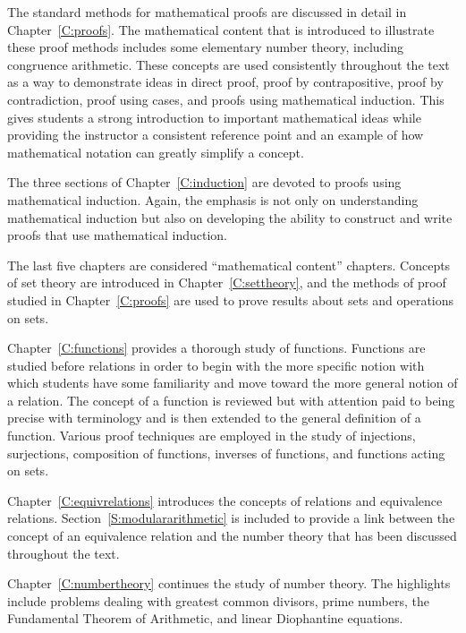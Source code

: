 The standard methods for mathematical proofs are discussed in detail in Chapter~\ref{C:proofs}.  The mathematical content that is introduced to illustrate these proof methods includes some elementary number theory, including congruence arithmetic.  These concepts are used consistently throughout the text as a way to demonstrate ideas in direct proof, proof by contrapositive, proof by contradiction, proof using cases, and proofs using mathematical induction.  This gives students a strong introduction to important mathematical ideas while providing the instructor a consistent reference point and an example of how mathematical notation can greatly simplify a concept.

The three sections of Chapter~\ref{C:induction} are devoted to proofs using mathematical induction.  Again, the emphasis is not only on understanding mathematical induction but also on developing the ability to construct and write proofs that use mathematical induction.




The last five chapters are considered ``mathematical content'' chapters.     Concepts of set theory are introduced in Chapter~\ref{C:settheory}, and the methods of proof studied in Chapter~\ref{C:proofs} are used to prove results about sets and operations on sets.  %

Chapter~\ref{C:functions} provides a thorough study of functions.  Functions are studied before relations in order to begin with the more specific notion with which students have some familiarity and move toward the more general notion of a relation.  The concept of a function is reviewed but with attention paid to being precise with terminology and is then extended to the general definition of a function.  Various proof techniques are employed in the study of injections, surjections, composition of functions,  inverses of functions, and functions acting on sets.  

Chapter~\ref{C:equivrelations} introduces the concepts of relations and equivalence relations.  %
Section~\ref{S:modulararithmetic} is included to provide a link between the concept of an equivalence relation and the number theory that has been discussed throughout the text.  

Chapter~\ref{C:numbertheory} continues the study of number theory.  The highlights include problems dealing with greatest common divisors, prime numbers, the Fundamental Theorem of Arithmetic, and linear Diophantine equations.  

